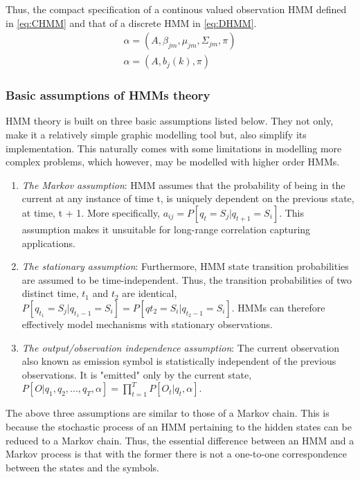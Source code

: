 Thus, the compact specification of a continous valued observation HMM defined in \ref{eq:CHMM} and that of a discrete HMM in \ref{eq:DHMM}.
\begin{align} 
	\alpha = (A, \beta_{jm}, \mu_{jm}, \Sigma_{jm}, \pi) \label{eq:CHMM} \\
	\alpha = (A, b_j(k), \pi) \label{eq:DHMM}
\end{align}

\subsubsection{Basic assumptions of HMMs theory}
HMM theory is built on three basic assumptions listed below. They not only, make it a relatively simple graphic modelling tool but, also simplify its implementation. This naturally comes with some limitations in modelling more complex problems, which however, may be modelled with higher order HMMs. %
\begin{enumerate}
\item \textit{The Markov assumption}: HMM assumes that the probability of being in the current	at any instance of time t, is uniquely dependent on the previous state, at time, t + 1. More specifically, \(a_{ij} = P[q_t = S_j|q_{t+1}=S_i]\). This assumption makes it unsuitable for long-range correlation capturing applications.
\item \textit{The stationary assumption}: Furthermore, HMM state transition probabilities are assumed to be time-independent. Thus, the transition probabilities of two distinct time, \(t_1\) and \(t_2\) are identical, \(P[q_{t_1} = S_j|q_{t_1 -1} = S_i] = P[q{t_2}=S_i|q_{t_2-1} = S_i]\). HMMs can therefore effectively model mechanisms with stationary observations.
\item \textit{The output/observation independence assumption}: The current observation also known as emission symbol is statistically independent of the previous observations. It is "emitted" only by the current state, \(P[O|q_1, q_2, ..., q_T, \alpha]=\prod_{t=1}^{T}P[O_t|q_t, \alpha]\).
\end{enumerate} 
The above three assumptions are similar to those of a Markov chain. This is because the stochastic process of an HMM pertaining to the hidden states can be reduced to a Markov chain. Thus, the essential difference between an HMM and a Markov process is that with the former there is not a one-to-one correspondence between the states and the symbols. %

